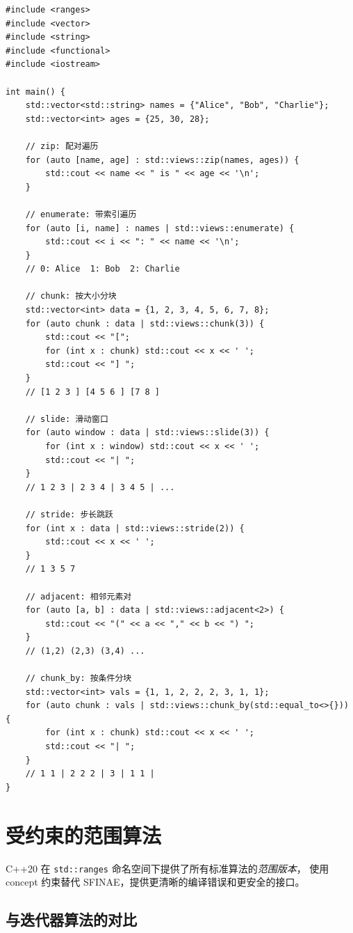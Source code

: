 \documentclass[12pt,a4paper,fontset=fandol]{ctexbook}
\newcommand{\cpp}[1]{C++#1}
\newcommand{\Tp}[1]{\texttt{#1}}
\begin{document}
\begin{lstlisting}
#include <ranges>
#include <vector>
#include <string>
#include <functional>
#include <iostream>

int main() {
    std::vector<std::string> names = {"Alice", "Bob", "Charlie"};
    std::vector<int> ages = {25, 30, 28};

    // zip: 配对遍历
    for (auto [name, age] : std::views::zip(names, ages)) {
        std::cout << name << " is " << age << '\n';
    }

    // enumerate: 带索引遍历
    for (auto [i, name] : names | std::views::enumerate) {
        std::cout << i << ": " << name << '\n';
    }
    // 0: Alice  1: Bob  2: Charlie

    // chunk: 按大小分块
    std::vector<int> data = {1, 2, 3, 4, 5, 6, 7, 8};
    for (auto chunk : data | std::views::chunk(3)) {
        std::cout << "[";
        for (int x : chunk) std::cout << x << ' ';
        std::cout << "] ";
    }
    // [1 2 3 ] [4 5 6 ] [7 8 ]

    // slide: 滑动窗口
    for (auto window : data | std::views::slide(3)) {
        for (int x : window) std::cout << x << ' ';
        std::cout << "| ";
    }
    // 1 2 3 | 2 3 4 | 3 4 5 | ...

    // stride: 步长跳跃
    for (int x : data | std::views::stride(2)) {
        std::cout << x << ' ';
    }
    // 1 3 5 7

    // adjacent: 相邻元素对
    for (auto [a, b] : data | std::views::adjacent<2>) {
        std::cout << "(" << a << "," << b << ") ";
    }
    // (1,2) (2,3) (3,4) ...

    // chunk_by: 按条件分块
    std::vector<int> vals = {1, 1, 2, 2, 2, 3, 1, 1};
    for (auto chunk : vals | std::views::chunk_by(std::equal_to<>{})) {
        for (int x : chunk) std::cout << x << ' ';
        std::cout << "| ";
    }
    // 1 1 | 2 2 2 | 3 | 1 1 |
}
\end{lstlisting}

\chapter{受约束的范围算法}

\cpp{20} 在 \Tp{std::ranges} 命名空间下提供了所有标准算法的\emph{范围版本}，
使用 concept 约束替代 SFINAE，提供更清晰的编译错误和更安全的接口。

\section{与迭代器算法的对比}
\end{document}
